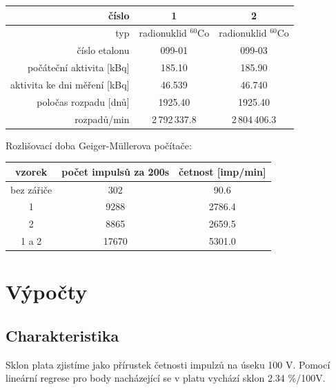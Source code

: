 \documentclass[11pt]{article}
\begin{document}
\begin{center}
\begin{tabular}{|r|c|c|}
\hline
číslo & 1 & 2 \\
\hline
typ   & radionuklid $^{60}$Co & radionuklid $^{60}$Co \\
číslo etalonu & 099-01 & 099-03 \\
počáteční aktivita [kBq] & 185.10 & 185.90 \\
aktivita ke dni měření [kBq] & 46.539 & 46.740 \\
poločas rozpadu [dnů] & 1925.40 & 1925.40 \\
rozpadů/min & 2\,792\,337.8 & 2\,804\,406.3 \\
\hline
\end{tabular}
\end{center}

\vspace{.5cm}
\noindent
Rozlišovací doba Geiger-M\"ullerova počítače:

\begin{center}
\begin{tabular}{|c|c|c|}
\hline
vzorek & počet impulsů za 200s & četnost [imp/min] \\
\hline
bez zářiče & 302 & 90.6 \\
1      & 9288  & 2786.4 \\
2      & 8865  & 2659.5 \\
1 a 2  & 17670 & 5301.0 \\
\hline
\end{tabular}
\end{center}


\section{Výpočty}
\subsection{Charakteristika}
Sklon plata zjistíme jako přírustek četnosti impulzů na úseku 100 V.  Pomocí
lineární regrese pro body nacházející se v platu vychází sklon 2.34 \%/100V.
\end{document}
